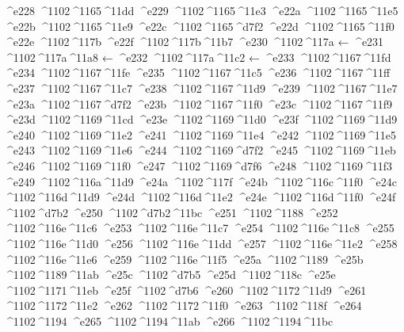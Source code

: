 \checkit ^^^^e228 ^^^^1102^^^^1165^^^^11dd
\checkit ^^^^e229 ^^^^1102^^^^1165^^^^11e3
\checkit ^^^^e22a ^^^^1102^^^^1165^^^^11e5
\checkit ^^^^e22b ^^^^1102^^^^1165^^^^11e9
\checkit ^^^^e22c ^^^^1102^^^^1165^^^^d7f2
\checkit ^^^^e22d ^^^^1102^^^^1165^^^^11f0
\checkit ^^^^e22e ^^^^1102^^^^117b
\checkit ^^^^e22f ^^^^1102^^^^117b^^^^11b7
\checkit ^^^^e230 ^^^^1102^^^^117a ←
\checkit ^^^^e231 ^^^^1102^^^^117a^^^^11a8 ←
\checkit ^^^^e232 ^^^^1102^^^^117a^^^^11c2 ←
\checkit ^^^^e233 ^^^^1102^^^^1167^^^^11fd
\checkit ^^^^e234 ^^^^1102^^^^1167^^^^11fe
\checkit ^^^^e235 ^^^^1102^^^^1167^^^^11c5
\checkit ^^^^e236 ^^^^1102^^^^1167^^^^11ff
\checkit ^^^^e237 ^^^^1102^^^^1167^^^^11c7
\checkit ^^^^e238 ^^^^1102^^^^1167^^^^11d9
\checkit ^^^^e239 ^^^^1102^^^^1167^^^^11e7
\checkit ^^^^e23a ^^^^1102^^^^1167^^^^d7f2
\checkit ^^^^e23b ^^^^1102^^^^1167^^^^11f0
\checkit ^^^^e23c ^^^^1102^^^^1167^^^^11f9
\checkit ^^^^e23d ^^^^1102^^^^1169^^^^11cd
\checkit ^^^^e23e ^^^^1102^^^^1169^^^^11d0
\checkit ^^^^e23f ^^^^1102^^^^1169^^^^11d9
\checkit ^^^^e240 ^^^^1102^^^^1169^^^^11e2
\checkit ^^^^e241 ^^^^1102^^^^1169^^^^11e4
\checkit ^^^^e242 ^^^^1102^^^^1169^^^^11e5
\checkit ^^^^e243 ^^^^1102^^^^1169^^^^11e6
\checkit ^^^^e244 ^^^^1102^^^^1169^^^^d7f2
\checkit ^^^^e245 ^^^^1102^^^^1169^^^^11eb
\checkit ^^^^e246 ^^^^1102^^^^1169^^^^11f0
\checkit ^^^^e247 ^^^^1102^^^^1169^^^^d7f6
\checkit ^^^^e248 ^^^^1102^^^^1169^^^^11f3
\checkit ^^^^e249 ^^^^1102^^^^116a^^^^11d9
\checkit ^^^^e24a ^^^^1102^^^^117f
\checkit ^^^^e24b ^^^^1102^^^^116c^^^^11f0
\checkit ^^^^e24c ^^^^1102^^^^116d^^^^11d9
\checkit ^^^^e24d ^^^^1102^^^^116d^^^^11e2
\checkit ^^^^e24e ^^^^1102^^^^116d^^^^11f0
\checkit ^^^^e24f ^^^^1102^^^^d7b2
\checkit ^^^^e250 ^^^^1102^^^^d7b2^^^^11bc
\checkit ^^^^e251 ^^^^1102^^^^1188
\checkit ^^^^e252 ^^^^1102^^^^116e^^^^11c6
\checkit ^^^^e253 ^^^^1102^^^^116e^^^^11c7
\checkit ^^^^e254 ^^^^1102^^^^116e^^^^11c8
\checkit ^^^^e255 ^^^^1102^^^^116e^^^^11d0
\checkit ^^^^e256 ^^^^1102^^^^116e^^^^11dd
\checkit ^^^^e257 ^^^^1102^^^^116e^^^^11e2
\checkit ^^^^e258 ^^^^1102^^^^116e^^^^11e6
\checkit ^^^^e259 ^^^^1102^^^^116e^^^^11f5
\checkit ^^^^e25a ^^^^1102^^^^1189
\checkit ^^^^e25b ^^^^1102^^^^1189^^^^11ab
\checkit ^^^^e25c ^^^^1102^^^^d7b5
\checkit ^^^^e25d ^^^^1102^^^^118c
\checkit ^^^^e25e ^^^^1102^^^^1171^^^^11eb
\checkit ^^^^e25f ^^^^1102^^^^d7b6
\checkit ^^^^e260 ^^^^1102^^^^1172^^^^11d9
\checkit ^^^^e261 ^^^^1102^^^^1172^^^^11e2
\checkit ^^^^e262 ^^^^1102^^^^1172^^^^11f0
\checkit ^^^^e263 ^^^^1102^^^^118f
\checkit ^^^^e264 ^^^^1102^^^^1194
\checkit ^^^^e265 ^^^^1102^^^^1194^^^^11ab
\checkit ^^^^e266 ^^^^1102^^^^1194^^^^11bc
